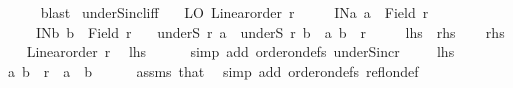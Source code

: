 \begin{isabellebody}
\ \ \ \ \isamarkupfalse%
\ blast\isanewline
{}\isamarkupfalse%
%
\endisatagproof
{\isafoldproof}%
%
\isadelimproof
\isanewline
%
\endisadelimproof
\isanewline
{}\isamarkupfalse%
\ underS{\isacharunderscore}{\kern0pt}incl{\isacharunderscore}{\kern0pt}iff{\isacharcolon}{\kern0pt}\isanewline
\ \ \ LO{\isacharcolon}{\kern0pt}\ {\isachardoublequoteopen}Linear{\isacharunderscore}{\kern0pt}order\ r{\isachardoublequoteclose}\isanewline
\ \ \ \ \ INa{\isacharcolon}{\kern0pt}\ {\isachardoublequoteopen}a\ {\isasymin}\ Field\ r{\isachardoublequoteclose}\isanewline
\ \ \ \ \ INb{\isacharcolon}{\kern0pt}\ {\isachardoublequoteopen}b\ {\isasymin}\ Field\ r{\isachardoublequoteclose}\isanewline
\ \ \ {\isachardoublequoteopen}underS\ r\ a\ {\isasymsubseteq}\ underS\ r\ b\ {\isasymlongleftrightarrow}\ {\isacharparenleft}{\kern0pt}a{\isacharcomma}{\kern0pt}\ b{\isacharparenright}{\kern0pt}\ {\isasymin}\ r{\isachardoublequoteclose}\isanewline
\ \ \ \ {\isacharparenleft}{\kern0pt}\ {\isachardoublequoteopen}{\isacharquery}{\kern0pt}lhs\ {\isasymlongleftrightarrow}\ {\isacharquery}{\kern0pt}rhs{\isachardoublequoteclose}{\isacharparenright}{\kern0pt}\isanewline
%
\isadelimproof
%
\endisadelimproof
%
\isatagproof
{}\isamarkupfalse%
\isanewline
\ \ \isamarkupfalse%
\ {\isacharquery}{\kern0pt}rhs\isanewline
\ \ \isamarkupfalse%
\ {\isacartoucheopen}Linear{\isacharunderscore}{\kern0pt}order\ r{\isacartoucheclose}\ \isamarkupfalse%
\ {\isacharquery}{\kern0pt}lhs\isanewline
\ \ \ \ \isamarkupfalse%
\ {\isacharparenleft}{\kern0pt}simp\ add{\isacharcolon}{\kern0pt}\ order{\isacharunderscore}{\kern0pt}on{\isacharunderscore}{\kern0pt}defs\ underS{\isacharunderscore}{\kern0pt}incr{\isacharparenright}{\kern0pt}\isanewline
{}\isamarkupfalse%
\isanewline
\ \ \isamarkupfalse%
\ {\isacharasterisk}{\kern0pt}{\isacharcolon}{\kern0pt}\ {\isacharquery}{\kern0pt}lhs\isanewline
\ \ \isamarkupfalse%
\ {\isachardoublequoteopen}{\isacharparenleft}{\kern0pt}a{\isacharcomma}{\kern0pt}\ b{\isacharparenright}{\kern0pt}\ {\isasymin}\ r{\isachardoublequoteclose}\ \ {\isachardoublequoteopen}a\ {\isacharequal}{\kern0pt}\ b{\isachardoublequoteclose}\isanewline
\ \ \ \ \isamarkupfalse%
\ assms\ that\ \isamarkupfalse%
\ {\isacharparenleft}{\kern0pt}simp\ add{\isacharcolon}{\kern0pt}\ order{\isacharunderscore}{\kern0pt}on{\isacharunderscore}{\kern0pt}defs\ refl{\isacharunderscore}{\kern0pt}on{\isacharunderscore}{\kern0pt}def{\isacharparenright}{\kern0pt}\isanewline

\end{isabellebody}

